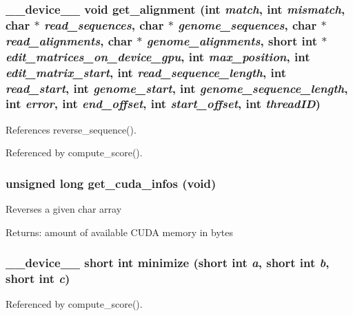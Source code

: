 \subsubsection[{get\_\-alignment}]{\setlength{\rightskip}{0pt plus 5cm}\_\-\_\-device\_\-\_\- void get\_\-alignment (int {\em match}, \/  int {\em mismatch}, \/  char $\ast$ {\em read\_\-sequences}, \/  char $\ast$ {\em genome\_\-sequences}, \/  char $\ast$ {\em read\_\-alignments}, \/  char $\ast$ {\em genome\_\-alignments}, \/  short int $\ast$ {\em edit\_\-matrices\_\-on\_\-device\_\-gpu}, \/  int {\em max\_\-position}, \/  int {\em edit\_\-matrix\_\-start}, \/  int {\em read\_\-sequence\_\-length}, \/  int {\em read\_\-start}, \/  int {\em genome\_\-start}, \/  int {\em genome\_\-sequence\_\-length}, \/  int {\em error}, \/  int {\em end\_\-offset}, \/  int {\em start\_\-offset}, \/  int {\em threadID})}\label{cuda-functions_8cu_b3260d9455dbbf368a170cf2f0126f03}




References reverse\_\-sequence().

Referenced by compute\_\-score().
\subsubsection[{get\_\-cuda\_\-infos}]{\setlength{\rightskip}{0pt plus 5cm}unsigned long get\_\-cuda\_\-infos (void)}\label{cuda-functions_8cu_b90f77b7522c839cc4e828829764091a}


Reverses a given char array \begin{Desc}
\item[Returns:]amount of available CUDA memory in bytes \end{Desc}
\subsubsection[{minimize}]{\setlength{\rightskip}{0pt plus 5cm}\_\-\_\-device\_\-\_\- short int minimize (short int {\em a}, \/  short int {\em b}, \/  short int {\em c})}\label{cuda-functions_8cu_89caa6813a2ac22973f3429b60d28efa}




Referenced by compute\_\-score().
